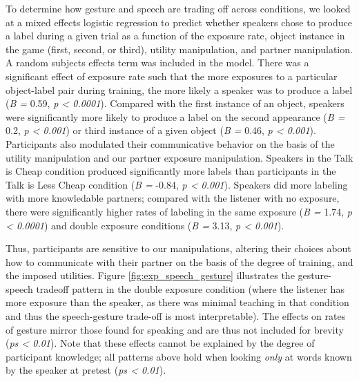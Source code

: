 \documentclass[10pt, letterpaper]{article}
\begin{document}
To determine how gesture and speech are trading off across conditions,
we looked at a mixed effects logistic regression to predict whether
speakers chose to produce a label during a given trial as a function of
the exposure rate, object instance in the game (first, second, or
third), utility manipulation, and partner manipulation. A random
subjects effects term was included in the model. There was a significant
effect of exposure rate such that the more exposures to a particular
object-label pair during training, the more likely a speaker was to
produce a label (\emph{B =} 0.59, \emph{p \textless{} 0.0001}). Compared
with the first instance of an object, speakers were significantly more
likely to produce a label on the second appearance (\emph{B =} 0.2,
\emph{p \textless{} 0.001}) or third instance of a given object (\emph{B
=} 0.46, \emph{p \textless{} 0.001}). Participants also modulated their
communicative behavior on the basis of the utility manipulation and our
partner exposure manipulation. Speakers in the Talk is Cheap condition
produced significantly more labels than participants in the Talk is Less
Cheap condition (\emph{B =} -0.84, \emph{p \textless{} 0.001}). Speakers
did more labeling with more knowledable partners; compared with the
listener with no exposure, there were significantly higher rates of
labeling in the same exposure (\emph{B =} 1.74, \emph{p \textless{}
0.0001}) and double exposure conditions (\emph{B =} 3.13, \emph{p
\textless{} 0.001}).

Thus, participants are sensitive to our manipulations, altering their
choices about how to communicate with their partner on the basis of the
degree of training, and the imposed utilities. Figure
\ref{fig:exp_speech_gesture} illustrates the gesture-speech tradeoff
pattern in the double exposure condition (where the listener has more
exposure than the speaker, as there was minimal teaching in that
condition and thus the speech-gesture trade-off is most interpretable).
The effects on rates of gesture mirror those found for speaking and are
thus not included for brevity (\emph{ps \textless{} 0.01}). Note that
these effects cannot be explained by the degree of participant
knowledge; all patterns above hold when looking \emph{only} at words
known by the speaker at pretest (\emph{ps \textless{} 0.01}).
\end{document}
